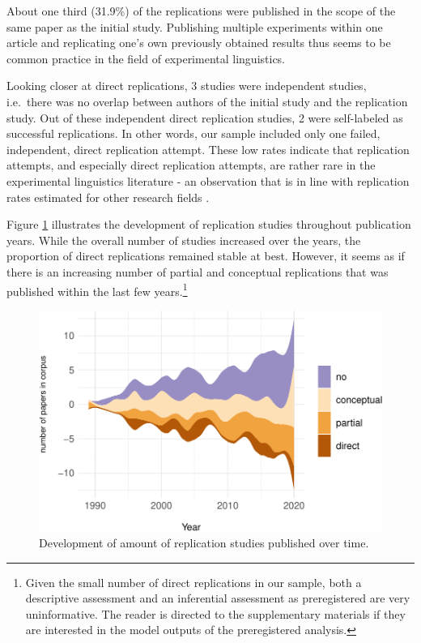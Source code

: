 \documentclass[cm,linguex]{glossa}
\begin{document}
About one third (31.9\%) of the replications were published in the scope of the same paper as the initial study. Publishing multiple experiments within one article and replicating one's own previously obtained results thus seems to be common practice in the field of experimental linguistics.

Looking closer at direct replications, 3 studies were independent studies, i.e.~there was no overlap between authors of the initial study and the replication study.
Out of these independent direct replication studies, 2 were self-labeled as successful replications.
In other words, our sample included only one failed, independent, direct replication attempt. These low rates indicate that replication attempts, and especially direct replication attempts, are rather rare in the experimental linguistics literature - an observation that is in line with replication rates estimated for other research fields \citep{makel_replications_2012, makel_facts_2014, mueller2019replication}.

Figure \ref{fig:stream-plot} illustrates the development of replication studies throughout publication years.
While the overall number of studies increased over the years, the proportion of direct replications remained stable at best.
However, it seems as if there is an increasing number of partial and conceptual replications that was published within the last few years.\footnote{Given the small number of direct replications in our sample, both a descriptive assessment and an inferential assessment as preregistered are very uninformative. The reader is directed to the supplementary materials if they are interested in the model outputs of the preregistered analysis.}

\begin{figure}

{\centering \includegraphics[width=1\linewidth]{ReplicationLingGlossa_files/figure-latex/stream-plot-1} 

}

\caption{Development of amount of replication studies published over time.}\label{fig:stream-plot}
\end{figure}
\end{document}

